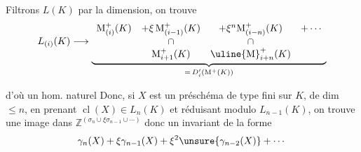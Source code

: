 Filtrons $L(K)$ par la dimension, on trouve
\[
L_{(i)}(K)\longrightarrow
\underbrace{
\begin{array}{ccccc}
\mathrm{M}^{+}_{(i)}(K)&+\xi\,\mathrm{M}^{+}_{(i-1)}(K)&+\xi^n\mathrm{M}^{+}_{(i-n)}(K)&+\cdots\\
&\cap&\cap\\
&\mathrm{M}^{+}_{i+1}(K)&\uline{\mathrm{M}}^{+}_{i+n}(K)
\end{array}}_{=\,D'_i(\mathrm{M}^{+}(K))}
\]

d'où un hom. naturel
Donc, si $X$ est un préschéma de type
fini  sur $K$, de dim $\leq n$, en
prenant $\operatorname{cl}(X)\in L_n(K)$ et réduisant
modulo $L_{n-1}(K)$, on trouve une image
dans $\mathbb{Z}^{(\sigma_n\cup\xi\sigma_{n-1}\cup\cdots)}$ donc un
invariant de la forme
\[
\gamma_n(X)+\xi\gamma_{n-1}(X)+\xi^2\unsure{\gamma_{n-2}(X)}+\cdots
\]
